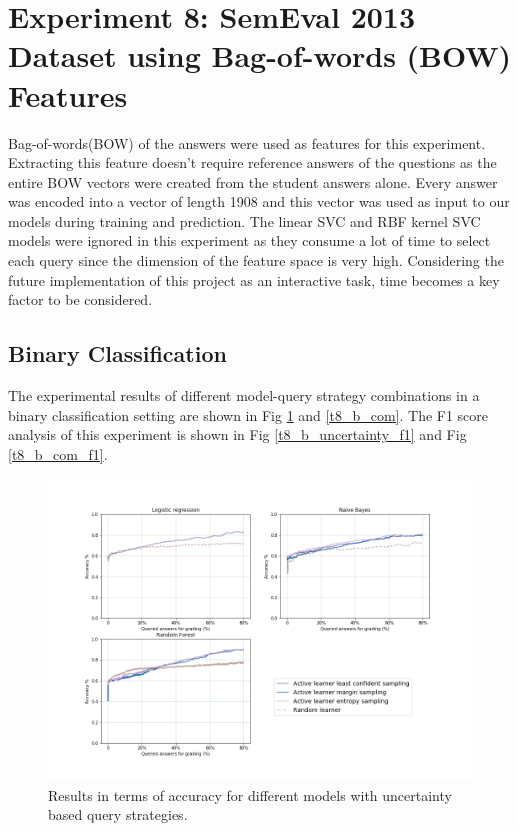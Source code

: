 	\clearpage
	
\section{Experiment 8: SemEval 2013 Dataset using Bag-of-words (BOW) Features}

Bag-of-words(BOW) of the answers were used as features for this experiment. Extracting this feature doesn't require reference answers of the questions as the entire BOW vectors were created from the student answers alone. Every answer was encoded into a vector of length 1908 and this vector was used as input to our models during training and prediction. The linear SVC and RBF kernel SVC models were ignored in this experiment as they consume a lot of time to select each query since the dimension of the feature space is very high. Considering the future implementation of this project as an interactive task, time becomes a key factor to be considered.   

\subsection{Binary Classification}

The experimental results of different model-query strategy combinations in a binary classification setting are shown in Fig \ref{t8_b_uncertainty} and \ref{t8_b_com}. The F1 score analysis of this experiment is shown in Fig \ref{t8_b_uncertainty_f1} and Fig \ref{t8_b_com_f1}. 

\begin{figure}[!htb]
	\centering
	\includegraphics[scale=0.46]{images/binary/task8_accuracy_uncertainty}
	\caption{Results in terms of accuracy for different models with uncertainty based query strategies.}
	\label{t8_b_uncertainty}
\end{figure}


